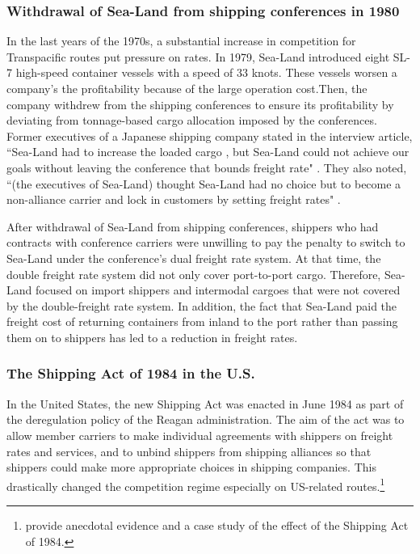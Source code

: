 \documentclass[11pt]{article}
\begin{document}
\subsubsection{Withdrawal of Sea-Land from shipping conferences in 1980}\label{subsec:withdrawal_of_sea-land_from_cartel_in_1980}
In the last years of the 1970s, a substantial increase in competition for Transpacific routes put pressure on rates. In 1979, Sea-Land introduced eight SL-7 high-speed container vessels with a speed of 33 knots. These vessels worsen a company's the profitability because of the large operation cost.Then, the company withdrew from the shipping conferences to ensure its profitability by deviating from tonnage-based cargo allocation imposed by the conferences. Former executives of a Japanese shipping company stated in the interview article, ``Sea-Land had to increase the loaded cargo , but Sea-Land could not achieve our goals without leaving the conference that bounds freight rate"  \citep{JapanMaritimeDaily2006}. They also noted, ``(the executives of Sea-Land) thought Sea-Land had no choice but to become a non-alliance carrier and lock in customers by setting freight rates" \citep{JapanMaritimeDaily2006}.

After withdrawal of Sea-Land from shipping conferences, shippers who had contracts with conference carriers were unwilling to pay the penalty to switch to Sea-Land under the conference's dual freight rate system. At that time, the double freight rate system did not only cover port-to-port cargo. Therefore, Sea-Land focused on import shippers and intermodal cargoes that were not covered by the double-freight rate system. In addition, the fact that Sea-Land paid the freight cost of returning containers from inland to the port rather than passing them on to shippers has led to a reduction in freight rates.

\subsubsection{The Shipping Act of 1984 in the U.S.}\label{subsec:shipping_act_of_1984}

In the United States, the new Shipping Act was enacted in June 1984 as part of the deregulation policy of the Reagan administration. The aim of the act was to allow member carriers to make individual agreements with shippers on freight rates and services, and to unbind shippers from shipping alliances so that shippers could make more appropriate choices in shipping companies. This drastically changed the competition regime especially on US-related routes.\footnote{\cite{wilson1991some} provide anecdotal evidence and a case study of the effect of the Shipping Act of 1984.}  
\end{document}

